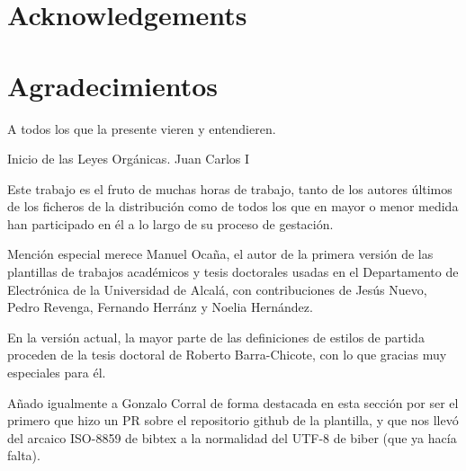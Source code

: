 %

\thispagestyle{empty}

{
  \chapter*{Acknowledgements}
  \label{cha:acknowledgements}
}
{
  \chapter*{Agradecimientos}
  \label{cha:agradecimientos}
}

\begin{FraseCelebre}
  \begin{Frase}
    A todos los que la presente vieren y entendieren.
  \end{Frase}
  \begin{Fuente}
    Inicio de las Leyes Orgánicas. Juan Carlos I
  \end{Fuente}
\end{FraseCelebre}



Este trabajo es el fruto de muchas horas de trabajo, tanto de los autores últimos de los ficheros de la distribución como de todos los que en mayor o menor medida han participado en él a lo largo de su proceso de gestación.

Mención especial merece Manuel Ocaña, el autor de la primera versión de las plantillas de trabajos académicos y tesis doctorales usadas en el Departamento de Electrónica de la Universidad de Alcalá, con contribuciones de Jesús Nuevo, Pedro Revenga, Fernando Herránz y Noelia Hernández.

En la versión actual, la mayor parte de las definiciones de estilos de partida proceden de la tesis doctoral de Roberto Barra-Chicote, con lo que gracias muy especiales para él.

Añado igualmente a Gonzalo Corral de forma destacada en esta sección por ser el primero que hizo un PR sobre el repositorio github de la plantilla, y que nos llevó del arcaico ISO-8859 de bibtex a la normalidad del UTF-8 de biber (que ya hacía falta).

